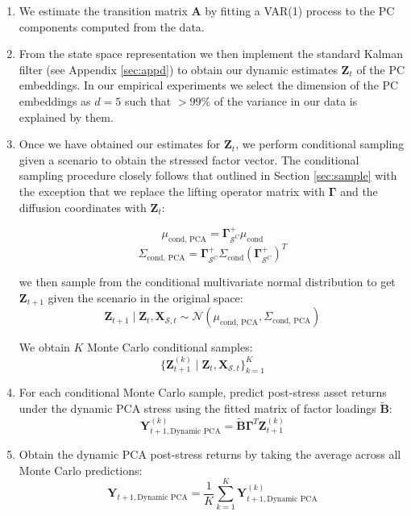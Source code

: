 \documentclass[11pt]{article}
\theoremstyle{plain}
\theoremstyle{definition}
\theoremstyle{remark}
\numberwithin{equation}{section}
\begin{document}
\begin{enumerate}

\item We estimate the transition matrix $\mathbf{A}$ by fitting a VAR(1) process to the PC components computed from the data. 

\item From the state space representation we then implement the standard Kalman filter (see Appendix \ref{sec:appd}) to obtain our dynamic estimates $\mathbf{Z}_t$ of the PC embeddings. In our empirical experiments we select the dimension of the PC embeddings as $d=5$ such that $>99\%$ of the variance in our data is explained by them. 

\item Once we have obtained our estimates for $\mathbf{Z}_t$, we perform conditional sampling given a scenario to obtain the stressed factor vector. The conditional sampling procedure closely follows that outlined in Section \ref{sec:sample} with the exception that we replace the lifting operator matrix with $\mathbf{\Gamma}$ and the diffusion coordinates with $\mathbf{Z}_t$:

\[\mu_{\text{cond, PCA}} = \mathbf{\Gamma}_{\mathcal{S}^C}^{+} \mu_{\mathrm{cond}}\]
\[\Sigma_{\text{cond, PCA}} = \mathbf{\Gamma}_{\mathcal{S}^C}^{+} \Sigma_{\mathrm{cond}} (\mathbf{\Gamma}_{\mathcal{S}^C}^{+})^T\]

we then sample from the conditional multivariate normal distribution to get $\mathbf{Z}_{t+1}$ given the scenario in the original space:
\[\mathbf{Z}_{t+1} \mid \mathbf{Z}_t, \mathbf{X}_{\mathcal{S}, t} \sim \mathcal{N}(\mu_{\text{cond, PCA}}, \Sigma_{\text{cond, PCA}})\]

We obtain $K$ Monte Carlo conditional samples:
\[ \{\mathbf{Z}^{(k)}_{t+1} \mid \mathbf{Z}_t, \mathbf{X}_{\mathcal{S}, t}\}_{k=1}^K\]

\item For each conditional Monte Carlo sample, predict post-stress asset returns under the dynamic PCA stress using the fitted matrix of factor loadings $\mathbf{\tilde{B}}$:
\[\mathbf{Y}_{t+1, \text{Dynamic PCA}}^{(k)}=\mathbf{\tilde{B}}\mathbf{\Gamma}^T \mathbf{Z}_{t+1}^{(k)}\]

\item Obtain the dynamic PCA post-stress returns by taking the average across all Monte Carlo predictions:
\[\mathbf{Y}_{t+1, \text{Dynamic PCA}}=\frac{1}{K} \sum_{k=1}^K \mathbf{Y}_{t+1, \text{Dynamic PCA}}^{(k)}\]
\end{enumerate}
\end{document}
